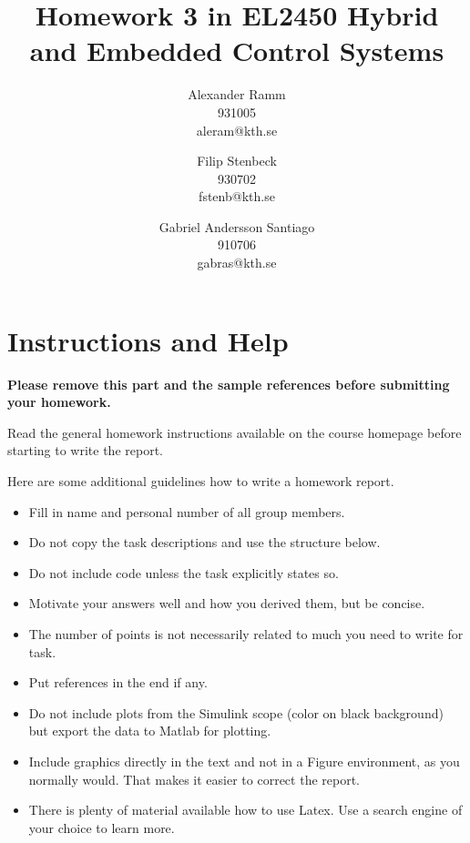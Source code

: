 \documentclass[a4paper,12pt,oneside,onecolumn]{article} %
\begin{document}

\title{Homework 3 in EL2450 Hybrid and Embedded Control Systems}
\author{
  Alexander Ramm \\ 931005 \\ aleram@kth.se 
  \and 
  Filip Stenbeck \\ 930702 \\ fstenb@kth.se
  \and
  Gabriel Andersson Santiago \\ 910706 \\ gabras@kth.se
  \and
  }

\maketitle                     %





\section*{Instructions and Help}

\textbf{Please remove this part and the sample references before submitting your homework.}

Read the general homework instructions available on the course homepage before starting to write the report.

Here are some additional guidelines how to write a homework report.
\begin{itemize}
 \item Fill in name and personal number of all group members.
 \item Do not copy the task descriptions and use the structure below.
 \item Do not include code unless the task explicitly states so.
 \item Motivate your answers well and how you derived them, but be concise.
 \item The number of points is not necessarily related to much you need to write for task.
 \item Put references in the end if any.
 \item Do not include plots from the Simulink scope (color on black background) but export the data to Matlab for plotting.
 \item Include graphics directly in the text and not in a Figure environment, as you normally would. That makes it easier to correct the report.
 \item There is plenty of material available how to use Latex. Use a search engine of your choice to learn more.
\end{itemize}
\end{document}
